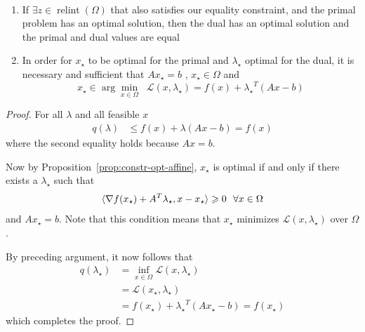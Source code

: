 \begin{theorem}\quad\\
\begin{enumerate}
\item If $\exists z \in \operatorname{rel int} (\Omega) $ that also satisfies our equality constraint,  and the primal problem has an optimal solution, then the dual has an optimal solution and the primal and dual values are equal
\item In order for $x_\star$ to be optimal for the primal and $\lambda_\star$ optimal for the dual, it is necessary and sufficient that $Ax_\star = b$ , $x_\star \in \Omega$ and $$x_\star \in \arg\min_{x\in \Omega}\;\; \mathcal{L} (x , \lambda_\star) = f(x) + {\lambda_\star}^T (Ax - b)$$
\end{enumerate}
\end{theorem}
\begin{proof}
For all $\lambda$ and all feasible $x$
\begin{align*}
q(\lambda)&\leq  f(x) + \lambda(Ax -b)= f(x)
\end{align*}
where the second equality holds because $Ax=b$.

Now by Proposition~\ref{prop:constr-opt-affine}, $x_\star$ is optimal if and only if there exists a $\lambda_\star$ such that
\[
 \langle \nabla f(x_\star) + A^T \lambda_\star, x- x_\star \rangle \geq 0~~\forall x\in \Omega\\
 \]
and $Ax_\star=b$.  Note that this condition means that $x_\star$ minimizes $\mathcal{L}(x,\lambda_\star)$ over $\Omega$.

  By preceding argument, it now follows that
  \begin{align*} 
  q(\lambda_\star) &= \inf_{x \in \Omega} \mathcal{L}(x, \lambda_\star)\\
  &= \mathcal{L}(x_\star, \lambda_\star)\\
  & = f(x_\star) + {\lambda_\star}^T(Ax_\star - b) = f(x_\star)
  \end{align*}
  which completes the proof.
\end{proof}  
